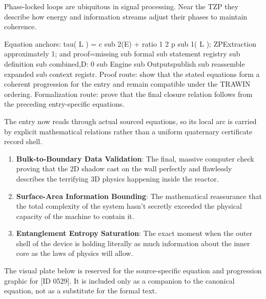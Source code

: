Phase-locked loops are ubiquitous in signal processing. Near the TZP they describe how energy and information streams adjust their phases to maintain coherence.

Equation anchors: tau( L ) = c sub 2(E) + ratio 1 2 p sub 1( L ); ZPExtraction approximately 1; and proof=missing sub formal sub statement registry sub definition sub combined,D: 0 sub Engine sub Outputspublish sub reassemble expanded sub context registr. Proof route: show that the stated equations form a coherent progression for the entry and remain compatible under the TRAWIN ordering. Formalization route: prove that the final closure relation follows from the preceding entry-specific equations.

The entry now reads through actual sourced equations, so its local arc is carried by explicit mathematical relations rather than a uniform quaternary certificate record shell.
\endgroup

\begin{enumerate}[leftmargin=1.6em,itemsep=6pt,topsep=4pt]
\item \textbf{Bulk-to-Boundary Data Validation}: The final, massive computer check proving that the 2D shadow cast on the wall perfectly and flawlessly describes the terrifying 3D physics happening inside the reactor.
\item \textbf{Surface-Area Information Bounding}: The mathematical reassurance that the total complexity of the system hasn't secretly exceeded the physical capacity of the machine to contain it.
\item \textbf{Entanglement Entropy Saturation}: The exact moment when the outer shell of the device is holding literally as much information about the inner core as the laws of physics will allow.
\end{enumerate}

\begingroup\footnotesize\sloppy
The visual plate below is reserved for the source-specific equation and progression graphic for [ID 0529]. It is included only as a companion to the canonical equation, not as a substitute for the formal text.
\par\endgroup
\ifTZPDarkEdition
{}
\fi

